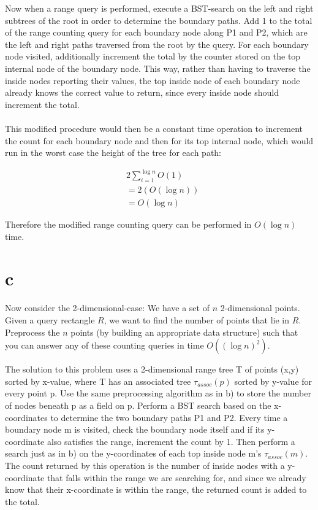 \documentclass[12pt]{article}
\begin{document}
\begin{enumerate}
Now when a range query is performed, execute a BST-search on the left and right subtrees of the root in order to determine the boundary paths. Add 1 to the total of the range counting query for each boundary node along P1 and P2, which are the left and right paths traversed from the root by the query. For each boundary node visited, additionally increment the total by the counter stored on the top internal node of the boundary node. This way, rather than having to traverse the inside nodes reporting their values, the top inside node of each boundary node already knows the correct value to return, since every inside node should increment the total.\\\\

This modified procedure would then be a constant time operation to increment the count for each boundary node and then for its top internal node, which would run in the worst case the height of the tree for each path:

\begin{align*}
  &2\sum_{i=1}^{\log n} O(1)\\
  &=2(O(\log n))\\
  &=O(\log n)
\end{align*}

Therefore the modified range counting query can be performed in $O(\log{n})$ time.

\part{c} Now consider the 2-dimensional-case: We have a set of $n$ 2-dimensional points.  Given a query rectangle $R$, we want to find the number of points that lie in $R$.  Preprocess the $n$ points (by building an appropriate data structure) such that you can answer any of these counting queries in time $O((\log n)^2)$.

The solution to this problem uses a 2-dimensional range tree T of points (x,y) sorted by x-value, where T has an associated tree $\tau_{assoc}(p)$ sorted by y-value for every point p. Use the same preprocessing algorithm as in b) to store the number of nodes beneath p as a field on p. Perform a BST search based on the x-coordinates to determine the two boundary paths P1 and P2. Every time a boundary node m is visited, check the boundary node itself and if its y-coordinate also satisfies the range, increment the count by 1. Then perform a search just as in b) on the y-coordinates of each top inside node m's $\tau_{assoc}(m)$. The count returned by this operation is the number of inside nodes with a y-coordinate that falls within the range we are searching for, and since we already know that their x-coordinate is within the range, the returned count is added to the total.\\\\


\end{enumerate}
\end{document}
